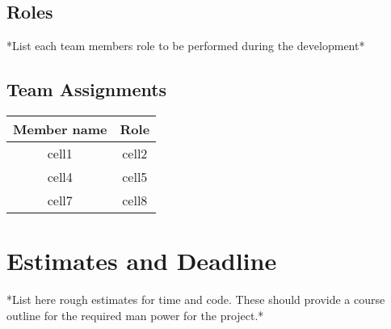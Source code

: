 \documentclass{article}
\begin{document}
\subsection{Roles} *List each team members role to be performed during the
development*
   
\subsection{Team Assignments}

\begin{center}
    \begin{tabular}
        { |c|c| }
        \hline
        Member name & Role \\
        \hline
        cell1 & cell2 \\
        cell4 & cell5 \\
        cell7 & cell8 \\
        \hline
    \end{tabular}
\end{center}

\section{Estimates and Deadline} *List here rough estimates for time and code.
These should provide a course outline for the required man power for the
project.*
\end{document}
